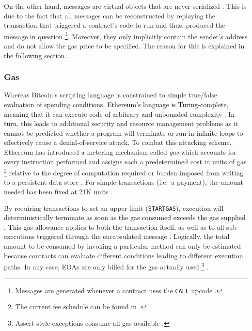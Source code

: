 On the other hand, messages are virtual objects that are never serialized \cite[p.~19]{ethereumWhitepaperGitHub}. This is due to the fact that all messages can be reconstructed by replaying the transaction that triggered a contract's code to run and thus, produced the message in question \footnote{Messages are generated whenever a contract uses the \texttt{CALL} upcode \cite[p.~19]{ethereumWhitepaperGitHub}.}. Moreover, they only implicitly contain the sender's address and do not allow the gas price to be specified. The reason for this is explained in the following section.

\subsubsection{Gas}
\label{sec:gas}
Whereas Bitcoin's scripting language is constrained to simple true/false evaluation of spending conditions, Ethereum's language is Turing-complete, meaning that it can execute code of arbitrary and unbounded complexity \cite[p.~25]{Antonopoulos.2018}. In turn, this leads to additional security and resource management problems as it cannot be predicted whether a program will terminate or run in infinite loops to effectively cause a denial-of-service attack. To combat this attacking scheme, Ethereum has introduced a metering mechanism called \textit{gas} which accounts for every instruction performed and assigns each a predetermined cost in units of gas \footnote{The current fee schedule can be found in \cite[p.~25]{ethereumYellowPaper}.} relative to the degree of computation required or burden imposed from writing to a persistent data store \cite[pp.~32--33]{Antonopoulos.2018}. For simple transactions (i.e.~a payment), the amount needed has been fixed at 21K units \cite[p.~153]{Antonopoulos.2018}. 

By requiring transactions to set an upper limit (\texttt{STARTGAS}), execution will deterministically terminate as soon as the gas consumed exceeds the gas supplied \cite[p.~33]{Antonopoulos.2018}. This gas allowance applies to both the transaction itself, as well as to all sub-executions triggered through the encapsulated message \cite[p.~19]{ethereumWhitepaperGitHub}. Logically, the total amount to be consumed by invoking a particular method can only be estimated because contracts can evaluate different conditions leading to different execution paths. In any case, \acp{EOA} are only billed for the gas actually used \footnote{Assert-style exceptions consume all gas available \cite[p.~75]{solidityDocs}.} \cite[p.~154]{Antonopoulos.2018}. 

